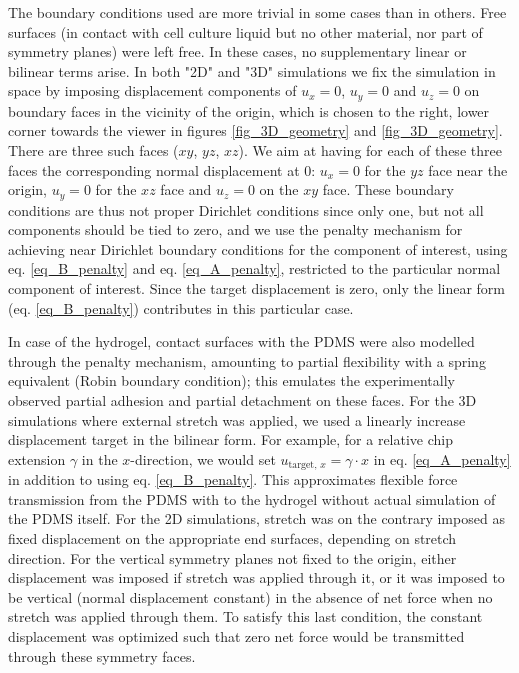 \documentclass[11pt]{amsart}
\begin{document}
The boundary conditions used are more trivial in some cases than in others. Free surfaces (in contact with cell culture liquid but no other material, nor part of symmetry planes) were left free. In these cases, no supplementary linear or bilinear terms arise. In both "2D" and "3D" simulations we fix the simulation in space by imposing displacement components of $u_x=0$, $u_y=0$ and $u_z=0$ on boundary faces in the vicinity of the origin, which is chosen to the right, lower corner towards the viewer in figures \ref{fig_3D_geometry} and \ref{fig_3D_geometry}. There are three such faces ($xy$, $yz$, $xz$). We aim at having for each of these three faces the corresponding normal displacement at 0: $u_x=0$ for the $yz$ face near the origin, $u_y=0$ for the $xz$ face and $u_z=0$ on the $xy$ face. These boundary conditions are thus not proper Dirichlet conditions since only one, but not all components should be tied to zero, and we use the penalty mechanism\cite{babuska_finite_1973} for achieving near Dirichlet boundary conditions for the component of interest, using eq. \ref{eq_B_penalty} and eq. \ref{eq_A_penalty}, restricted to the particular normal component of interest. Since the target displacement is zero, only the linear form (eq. \ref{eq_B_penalty}) contributes in this particular case.  

In case of the hydrogel, contact surfaces with the PDMS were also modelled through the penalty mechanism, amounting to partial flexibility with a spring equivalent (Robin boundary condition\cite{gustafson_third_1998}); this emulates the experimentally observed partial adhesion and partial detachment on these faces. For the 3D simulations where external stretch was applied, we used a linearly increase displacement target in the bilinear form. For example, for a relative chip extension $\gamma$ in the $x$-direction, we would set $u_{\text{target, }x}=\gamma \cdot x$ in eq. \ref{eq_A_penalty} in addition to using eq. \ref{eq_B_penalty}. This approximates flexible force transmission from the PDMS with to the hydrogel without actual simulation of the PDMS itself. For the 2D simulations, stretch was on the contrary imposed as fixed displacement on the appropriate end surfaces, depending on stretch direction. For the vertical symmetry planes not fixed to the origin, either displacement was imposed if stretch was applied through it, or it was imposed to be vertical (normal displacement constant) in the absence of net force when no stretch was applied through them. To satisfy this last condition, the constant displacement was optimized such that zero net force would be transmitted through these symmetry faces.
\end{document}
